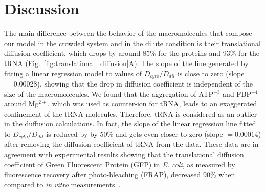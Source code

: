 \documentclass[journal=jcisd8,manuscript=article]{achemso}
\begin{document}
\section*{Discussion}\label{sec:dissc}
The main difference between the behavior of the macromolecules that
compose our model in the crowded system and in the dilute condition is
their translational diffusion coefficient, which drops by around
85\% for the proteins and 93\% for the tRNA
(Fig.~\ref{fig:translational_diffusion}A). The slope of the line
generated by fitting a linear regression model to values of
$D_{cyto}/D_{dil}$ is close to zero (slope $= 0.00028$), showing that
the drop in diffusion coefficient is independent of the size of the
macromolecules. We found that the aggregation of ATP$^{-3}$ and
FBP$^{-4}$ around Mg$^{2+}$, which was used as counter-ion for tRNA,
leads to an exaggerated confinement of the tRNA molecules.  Therefore,
tRNA is considered as an outlier in the duffusion calculations. In
fact, the slope of the linear regression line fitted to
$D_{cyto}/D_{dil}$ is reduced by by 50\% and gets even closer to zero
(slope $= 0.00014$) after removing the diffusion coefficient of tRNA
from the data. These data are in agreement with experimental results
showing that the translational diffusion coefficient of Green
Fluorescent Protein (GFP) in {\em E. coli}, as measured by
fluorescence recovery after photo-bleaching (FRAP), decreased 90\%
when compared to {\em in vitro}
measurements~\cite{Elowitz1999,Konopka2006}.

\end{document}
